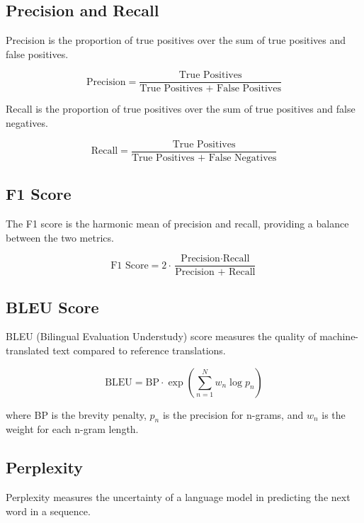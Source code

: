\subsection{Precision and Recall}
Precision is the proportion of true positives over the sum of true positives and false positives.

\begin{equation}
\text{Precision} = \frac{\text{True Positives}}{\text{True Positives + False Positives}}
\end{equation}

Recall is the proportion of true positives over the sum of true positives and false negatives.

\begin{equation}
\text{Recall} = \frac{\text{True Positives}}{\text{True Positives + False Negatives}}
\end{equation}

\subsection{F1 Score}
The F1 score is the harmonic mean of precision and recall, providing a balance between the two metrics.

\begin{equation}
\text{F1 Score} = 2 \cdot \frac{\text{Precision} \cdot \text{Recall}}{\text{Precision + Recall}}
\end{equation}

\subsection{BLEU Score}
BLEU (Bilingual Evaluation Understudy) score measures the quality of machine-translated text compared to reference translations.

\begin{equation}
\text{BLEU} = \text{BP} \cdot \exp \left( \sum_{n=1}^N w_n \log p_n \right)
\end{equation}

where BP is the brevity penalty, \( p_n \) is the precision for n-grams, and \( w_n \) is the weight for each n-gram length.

\subsection{Perplexity}
Perplexity measures the uncertainty of a language model in predicting the next word in a sequence.

